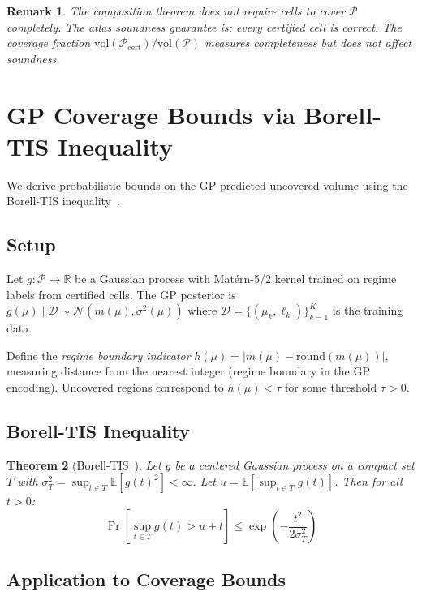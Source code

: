 \documentclass[11pt]{article}
\newtheorem{theorem}{Theorem}
\newtheorem{remark}[theorem]{Remark}
\newcommand{\R}{\mathbb{R}}
\begin{document}
\begin{remark}
The composition theorem does not require cells to cover $\mathcal{P}$ completely.
The atlas soundness guarantee is: every certified cell is correct.
The coverage fraction $\mathrm{vol}(\mathcal{P}_{\mathrm{cert}}) / \mathrm{vol}(\mathcal{P})$ measures completeness but does not affect soundness.
\end{remark}

\section{GP Coverage Bounds via Borell-TIS Inequality}
\label{app:gp-bounds}

We derive probabilistic bounds on the GP-predicted uncovered volume using the Borell-TIS inequality~\cite{borell1975}.

\subsection{Setup}

Let $g: \mathcal{P} \to \R$ be a Gaussian process with Mat\'ern-5/2 kernel trained on regime labels from certified cells.
The GP posterior is $g(\mu) \mid \mathcal{D} \sim \mathcal{N}(m(\mu), \sigma^2(\mu))$ where $\mathcal{D} = \{(\mu_k, \ell_k)\}_{k=1}^K$ is the training data.

Define the \emph{regime boundary indicator} $h(\mu) = |m(\mu) - \mathrm{round}(m(\mu))|$, measuring distance from the nearest integer (regime boundary in the GP encoding).
Uncovered regions correspond to $h(\mu) < \tau$ for some threshold $\tau > 0$.

\subsection{Borell-TIS Inequality}

\begin{theorem}[Borell-TIS~\cite{borell1975}]
\label{thm:borell-tis}
Let $g$ be a centered Gaussian process on a compact set $T$ with $\sigma_T^2 = \sup_{t \in T} \mathbb{E}[g(t)^2] < \infty$.
Let $u = \mathbb{E}[\sup_{t \in T} g(t)]$.
Then for all $t > 0$:
\[
\Pr\!\left[\sup_{t \in T} g(t) > u + t\right] \leq \exp\!\left(-\frac{t^2}{2\sigma_T^2}\right)
\]
\end{theorem}

\subsection{Application to Coverage Bounds}
\end{document}
